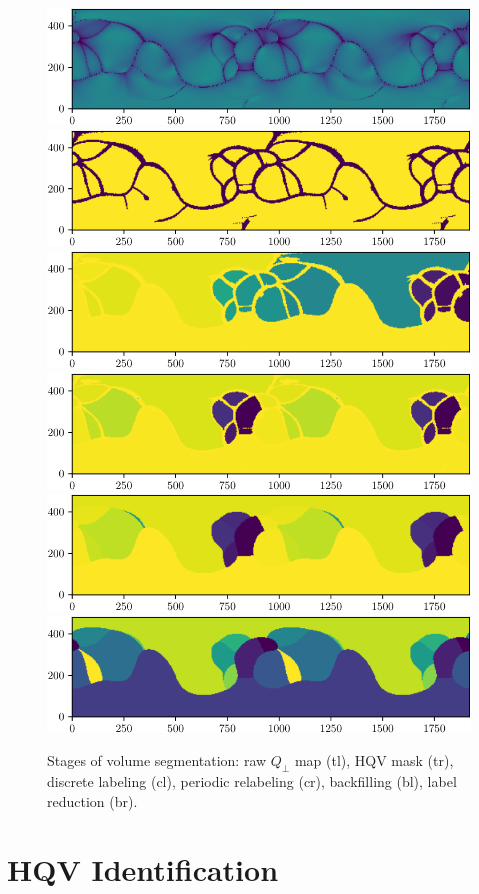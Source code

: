 \documentclass[10pt]{aastex62}
\begin{document}
\begin{itemize}
\begin{figure}
\center
\includegraphics[width=0.45\linewidth]{./fig_src_fls/seg0}\hspace{0.1in}\includegraphics[width=0.45\linewidth]{./fig_src_fls/seg1}\\
\vspace{0.1in}
\includegraphics[width=0.45\linewidth]{./fig_src_fls/seg2}\hspace{0.1in}\includegraphics[width=0.45\linewidth]{./fig_src_fls/seg3}\\
\vspace{0.1in}
\includegraphics[width=0.45\linewidth]{./fig_src_fls/seg4}\hspace{0.1in}\includegraphics[width=0.45\linewidth]{./fig_src_fls/seg5}
\caption{Stages of volume segmentation: raw $Q_\perp$ map (tl), HQV mask (tr), discrete labeling (cl), periodic relabeling (cr), backfilling (bl), label reduction (br).}
\label{seg_steps.fig}
\end{figure}

\section{HQV Identification}


\end{itemize}
\end{document}
